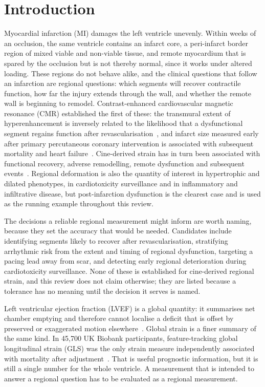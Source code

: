 \section{Introduction}\label{sec:introduction}

Myocardial infarction (MI) damages the left ventricle unevenly. Within weeks of an occlusion, the
same ventricle contains an infarct core, a peri-infarct border region of mixed viable and
non-viable tissue, and remote myocardium that is spared by the occlusion but is not thereby normal,
since it works under altered loading. These regions do not behave alike, and the clinical questions that follow an infarction are
regional questions: which segments will recover contractile function, how far the injury extends
through the wall, and whether the remote wall is beginning to remodel. Contrast-enhanced cardiovascular magnetic
resonance (CMR) established the first of these: the transmural extent of hyperenhancement is inversely related to
the likelihood that a dysfunctional segment regains function after revascularisation~\citep{kim2000},
and infarct size measured early after primary percutaneous coronary intervention is associated with
subsequent mortality and heart failure~\citep{stone2016}. Cine-derived strain has in turn been
associated with functional recovery, adverse remodelling, remote dysfunction and subsequent
events~\citep{buss2015,reindl2021,delcanto2026,he2024}. Regional deformation is also the quantity of
interest in hypertrophic and dilated phenotypes, in cardiotoxicity surveillance and in inflammatory
and infiltrative disease, but post-infarction dysfunction is the clearest case and is used as the
running example throughout this review.

The decisions a reliable regional measurement might inform are worth naming, because they set the
accuracy that would be needed. Candidates include identifying segments likely to recover after
revascularisation, stratifying arrhythmic risk from the extent and timing of regional dysfunction,
targeting a pacing lead away from scar, and detecting early regional deterioration during
cardiotoxicity surveillance. None of these is established for cine-derived regional strain, and this
review does not claim otherwise; they are listed because a tolerance has no meaning until the
decision it serves is named.

Left ventricular ejection fraction (LVEF) is a global quantity: it summarises net chamber emptying
and therefore cannot localise a deficit that is offset by preserved or exaggerated motion
elsewhere~\citep{schulzmenger2020,hundley2022}. Global strain is a finer summary of the same kind.
In 45,700 UK Biobank participants, feature-tracking global longitudinal strain (GLS) was the only
strain measure independently associated with mortality after
adjustment~\citep{chadalavada2024}. That is useful prognostic information, but it is still a single
number for the whole ventricle. A measurement that is intended to answer a regional question has to be
evaluated as a regional measurement.

